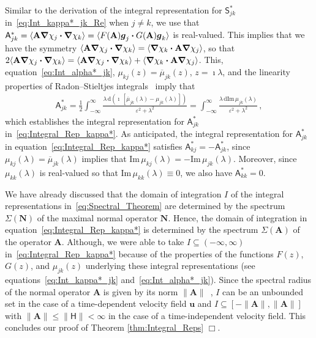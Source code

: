 \documentclass[leqno,onefignum,onetabnum]{siamltex1213}
\renewcommand{\d}{\mathrm{d}}
\newcommand{\Ab}{\mathbf{A}}
\newcommand{\Nb}{\mathbf{N}}
\newcommand{\Hm}{\mathsf{H}}
\newcommand{\Sm}{\mathsf{S}}
\newcommand{\Am}{\mathsf{A}}
\newcommand\bnabla{\mbox{\boldmath${\nabla}$}}
\providecommand\bcdot{\boldsymbol{\cdot}}
\newcommand{\vecg}{\boldsymbol{g}}
\newcommand{\vecu}{\boldsymbol{u}}
\begin{document}
Similar to the derivation of the integral representation for
$\Sm^*_{jk}$ in~\eqref{eq:Int_kappa*_jk_Re} when $j\neq k$, we use that
$\Am^*_{jk}=\langle\Ab\bnabla \chi_j\bcdot\bnabla \chi_k\rangle=\langle F(\Ab)\vecg_j\bcdot G(\Ab)\vecg_k\rangle$
is real-valued. This implies that we have the symmetry
$\langle\Ab\bnabla \chi_j\bcdot\bnabla \chi_k\rangle=\langle\bnabla \chi_k\bcdot\Ab\bnabla \chi_j\rangle$, so that
$2\langle\Ab\bnabla \chi_j\bcdot\bnabla \chi_k\rangle=\langle\Ab\bnabla \chi_j\bcdot\bnabla \chi_k\rangle+\langle\bnabla \chi_k\bcdot\Ab\bnabla \chi_j\rangle$.
This, equation~\eqref{eq:Int_alpha*_jk},
$\mu_{kj}(z)=\overline{\mu}_{jk}(z)$, $z=\imath\lambda$, and the
linearity properties of Radon--Stieltjes integrals~\cite{Stone:64}
imply that 
% 
\begin{align}\label{eq:Int_kappa*_jk_Im}
  \Am^*_{jk}
       =\frac{1}{2}\int_{-\infty}^\infty\frac{\lambda\,\d(\imath\,[\overline{\mu}_{jk}(\lambda)-\mu_{jk}(\lambda)])}{\varepsilon^2+\lambda^2}
       =\int_{-\infty}^\infty\frac{\lambda\,\d\text{Im}\,\mu_{jk}(\lambda)}{\varepsilon^2+\lambda^2}\,,            
\end{align}
%
which establishes the integral representation for $\Am^*_{jk}$
in~\eqref{eq:Integral_Rep_kappa*}. As anticipated, the integral 
representation for $\Am^*_{jk}$ in
equation~\eqref{eq:Integral_Rep_kappa*} satisfies
$\Am^*_{kj}=-\Am^*_{jk}$, since 
$\mu_{kj}(\lambda)=\overline{\mu}_{jk}(\lambda)$ implies that
$\text{Im}\,\mu_{kj}(\lambda)=-\text{Im}\,\mu_{jk}(\lambda)$. Moreover, since
$\mu_{kk}(\lambda)$ is real-valued so that $\text{Im}\,\mu_{kk}(\lambda)\equiv0$, we also
have $\Am^*_{kk}=0$.   



We have already discussed that the domain of integration $I$ of the
integral representations in~\eqref{eq:Spectral_Theorem} are determined
by the spectrum $\Sigma(\Nb)$ of the maximal normal operator $\Nb$. Hence,
the domain of integration in equation~\eqref{eq:Integral_Rep_kappa*}
is determined by the spectrum $\Sigma(\Ab)$ of the operator
$\Ab$. Although, we were able to take $I\subseteq(-\infty,\infty)$
in~\eqref{eq:Integral_Rep_kappa*} because of the properties of the 
functions $F(z)$, $G(z)$, and $\mu_{jk}(z)$ underlying these integral
representations (see equations~\eqref{eq:Int_kappa*_jk}
and~\eqref{eq:Int_alpha*_jk}). Since the spectral radius of the normal 
operator $\Ab$ is given by its norm $\|\Ab\|$~\cite{Reed-1980}, $I$ can
be an unbounded set in the case of a time-dependent velocity field
$\vecu $ and $I\subseteq[-\|\Ab\|,\|\Ab\|]$ with $\|\Ab\|\leq\|\Hm\|<\infty$ in the case of a
time-independent velocity field. This concludes our proof of Theorem
\ref{thm:Integral_Reps} $\Box$.    
\end{document}
